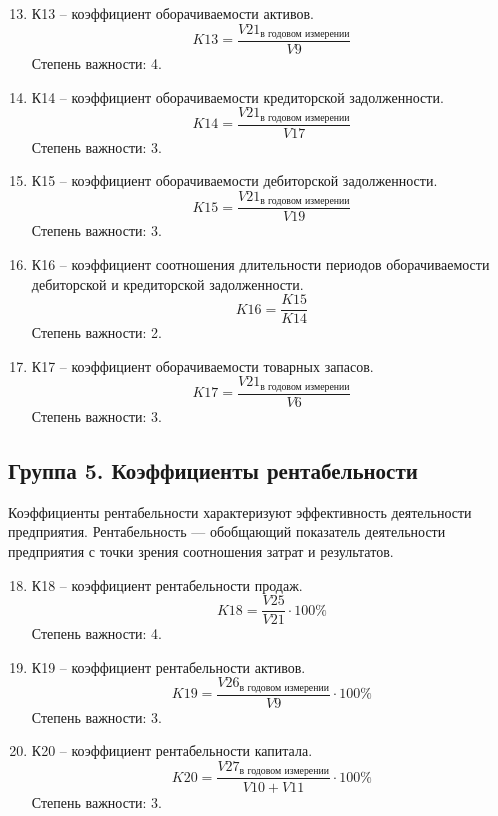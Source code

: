 \documentclass[14pt,a4paper]{extarticle}
\begin{document}
\begin{enumerate}
\setcounter{enumi}{12}
\item К13 – коэффициент оборачиваемости активов.
\[
K13 = \frac{V21_{\text{в годовом измерении}}}{V9}
\]
Степень важности: 4.

\item К14 – коэффициент оборачиваемости кредиторской задолженности.
\[
K14 = \frac{V21_{\text{в годовом измерении}}}{V17}
\]
Степень важности: 3.

\item К15 – коэффициент оборачиваемости дебиторской задолженности.
\[
K15 = \frac{V21_{\text{в годовом измерении}}}{V19}
\]
Степень важности: 3.

\item К16 – коэффициент соотношения длительности периодов оборачиваемости дебиторской 
и кредиторской задолженности.
\[
K16 = \frac{K15}{K14}
\]
Степень важности: 2.

\item К17 – коэффициент оборачиваемости товарных запасов.
\[
K17 = \frac{V21_{\text{в годовом измерении}}}{V6}
\]
Степень важности: 3.
\end{enumerate}

\subsection*{Группа 5. Коэффициенты рентабельности}
Коэффициенты рентабельности характеризуют эффективность деятельности предприятия. Рентабельность — обобщающий показатель деятельности предприятия с точки зрения соотношения затрат и результатов.

\begin{enumerate}
\setcounter{enumi}{17}
\item К18 – коэффициент рентабельности продаж.
\[
K18 = \frac{V25}{V21} \cdot 100\%
\]
Степень важности: 4.

\item К19 – коэффициент рентабельности активов.
\[
K19 = \frac{V26_{\text{в годовом измерении}}}{V9} \cdot 100\%
\]
Степень важности: 3.

\item К20 – коэффициент рентабельности капитала.
\[
K20 = \frac{V27_{\text{в годовом измерении}}}{V10 + V11} \cdot 100\%
\]
Степень важности: 3.
\end{enumerate}
\end{document}
